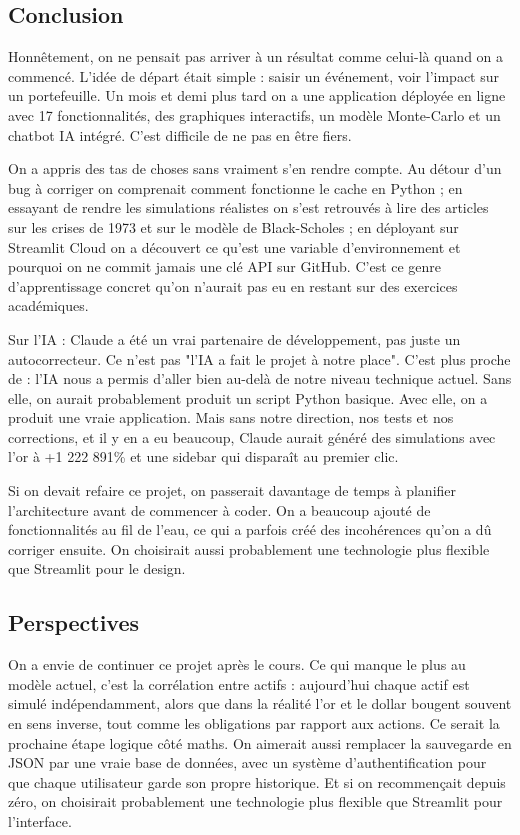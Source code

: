 \documentclass[a4paper, 12pt, twoside]{article}
\begin{document}
\subsection{Conclusion}

Honnêtement, on ne pensait pas arriver à un résultat comme celui-là quand on a
commencé. L'idée de départ était simple : saisir un événement, voir l'impact sur un
portefeuille. Un mois et demi plus tard on a une application déployée en ligne avec
17 fonctionnalités, des graphiques interactifs, un modèle Monte-Carlo et un chatbot
IA intégré. C'est difficile de ne pas en être fiers.

On a appris des tas de choses sans vraiment s'en rendre compte. Au détour d'un bug
à corriger on comprenait comment fonctionne le cache en Python ; en essayant de rendre
les simulations réalistes on s'est retrouvés à lire des articles sur les crises de
1973 et sur le modèle de Black-Scholes ; en déployant sur Streamlit Cloud on a
découvert ce qu'est une variable d'environnement et pourquoi on ne commit jamais une
clé API sur GitHub. C'est ce genre d'apprentissage concret qu'on n'aurait pas eu en
restant sur des exercices académiques.

Sur l'IA : Claude a été un vrai partenaire de développement, pas juste un
autocorrecteur. Ce n'est pas "l'IA a fait le projet à notre place". C'est plus proche
de : l'IA nous a permis d'aller bien au-delà de notre niveau technique actuel. Sans
elle, on aurait probablement produit un script Python basique. Avec elle, on a produit
une vraie application. Mais sans notre direction, nos tests et nos corrections, et il
y en a eu beaucoup, Claude aurait généré des simulations avec l'or à +1 222 891\% et
une sidebar qui disparaît au premier clic.

Si on devait refaire ce projet, on passerait davantage de temps à planifier
l'architecture avant de commencer à coder. On a beaucoup ajouté de fonctionnalités
au fil de l'eau, ce qui a parfois créé des incohérences qu'on a dû corriger ensuite.
On choisirait aussi probablement une technologie plus flexible que Streamlit pour le
design.

\subsection{Perspectives}

On a envie de continuer ce projet après le cours. Ce qui manque le plus au modèle
actuel, c'est la corrélation entre actifs : aujourd'hui chaque actif est simulé
indépendamment, alors que dans la réalité l'or et le dollar bougent souvent en sens
inverse, tout comme les obligations par rapport aux actions. Ce serait la prochaine
étape logique côté maths. On aimerait aussi remplacer la sauvegarde en JSON par une
vraie base de données, avec un système d'authentification pour que chaque utilisateur
garde son propre historique. Et si on recommençait depuis zéro, on choisirait
probablement une technologie plus flexible que Streamlit pour l'interface.
\end{document}
